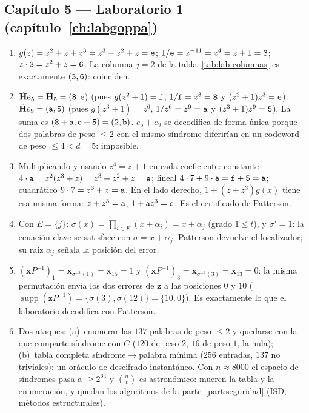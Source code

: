 \documentclass[11pt,a4paper,oneside]{report}
\newcommand{\supp}{\operatorname{supp}}
\newcommand{\Hmat}{\mathbf{H}}          %
\newcommand{\vx}{\mathbf{x}}
\newcommand{\vz}{\mathbf{z}}
\newcommand{\hx}[1]{\text{\texttt{#1}}}
\begin{document}
\subsection*{Capítulo 5 --- Laboratorio 1
(capítulo~\ref{ch:labgoppa})}

\begin{enumerate}[leftmargin=1.9em,itemsep=4pt]
  \item $g(z)=z^2+z+z^3=z^3+z^2+z=\hx e$; $1/\hx e=z^{-11}=z^4
        =z+1=\hx3$; $z\cdot\hx3=z^2+z=\hx6$. La columna $j=2$ de
        la tabla~\ref{tab:lab-columnas} es exactamente $(\hx3,\hx6)$:
        coinciden.
  \item $\tilde{\Hmat}e_5=\tilde{\Hmat}_5=(\hx8,\hx e)$ (pues
        $g(z^2+1)=\hx f$, $1/\hx f=z^3=\hx8$ y
        $(z^2+1)z^3=\hx e$); $\tilde{\Hmat}e_9=(\hx a,\hx5)$ (pues
        $g(z^3+1)=z^6$, $1/z^6=z^9=\hx a$ y
        $(z^3+1)z^9=\hx5$). La suma es
        $(\hx8+\hx a,\hx e+\hx5)=(\hx2,\hx b)$. $e_5+e_9$ se decodifica
        de forma única porque dos palabras de peso $\le2$ con el
        mismo síndrome diferirían en un codeword de peso
        $\le4<d=5$: imposible.
  \item Multiplicando y usando $z^4=z+1$ en cada coeficiente:
        constante $4\cdot\hx a=z^2(z^3+z)=z^3+z^2+z=\hx e$; lineal
        $4\cdot7+9\cdot\hx a=\hx f+\hx5=\hx a$; cuadrático
        $9\cdot7=z^3+z=\hx a$. En el lado derecho,
        $1+(z+z^3)g(x)$ tiene esa misma forma: $z+z^3=\hx a$,
        $1+\hx a z^3=\hx e$. Es el certificado de Patterson.
  \item Con $E=\{j\}$: $\sigma(x)=\prod_{i\in E}(x+\alpha_i)
        =x+\alpha_j$ (grado $1\le t$), y $\sigma'=1$: la ecuación
        clave se satisface con $\sigma=x+\alpha_j$. Patterson
        devuelve el localizador; su raíz $\alpha_j$ señala la
        posición del error.
  \item $(\vx P^{-1})_1=\vx_{\sigma^{-1}(1)}=\vx_{15}=1$ y
        $(\vx P^{-1})_3=\vx_{\sigma^{-1}(3)}=\vx_{13}=0$: la misma
        permutación envía los dos errores de $\vz$ a las posiciones
        $0$ y $10$ ($\supp(\vz P^{-1})=\{\sigma(3),\sigma(12)\}
        =\{10,0\}$). Es exactamente lo que el laboratorio decodifica
        con Patterson.
  \item Dos ataques: (a)~enumerar las $137$ palabras de peso $\le2$
        y quedarse con la que comparte síndrome con $C$
        ($120$ de peso $2$, $16$ de peso $1$, la nula);
        (b)~tabla completa síndrome$\to$palabra mínima ($256$
        entradas, $137$ no triviales): un oráculo de descifrado
        instantáneo. Con $n\approx8000$ el espacio de síndromes pasa
        a $\ge2^{64}$ y $\binom{n}{t}$ es astronómico: mueren la
        tabla y la enumeración, y quedan los algoritmos de la
        parte~\ref{part:seguridad} (ISD, métodos estructurales).
\end{enumerate}
\end{document}
